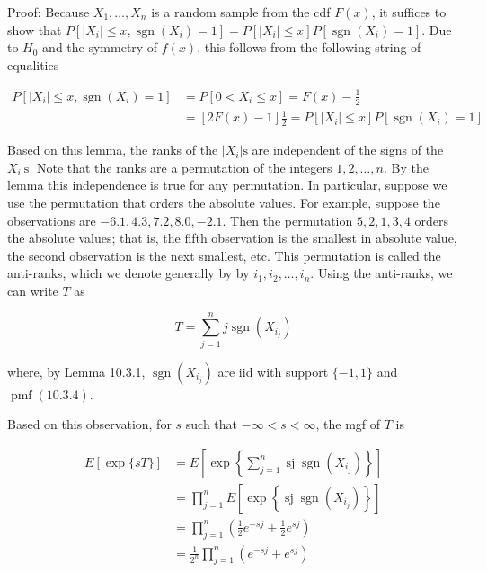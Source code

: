 Proof: Because $X_{1}, \ldots, X_{n}$ is a random sample from the cdf $F(x)$, it suffices to show that $P\left[\left|X_{i}\right| \leq x, \operatorname{sgn}\left(X_{i}\right)=1\right]=P\left[\left|X_{i}\right| \leq x\right] P\left[\operatorname{sgn}\left(X_{i}\right)=1\right]$. Due to $H_{0}$ and the symmetry of $f(x)$, this follows from the following string of equalities

$$
\begin{aligned}
P\left[\left|X_{i}\right| \leq x, \operatorname{sgn}\left(X_{i}\right)=1\right] & =P\left[0<X_{i} \leq x\right]=F(x)-\frac{1}{2} \\
& =[2 F(x)-1] \frac{1}{2}=P\left[\left|X_{i}\right| \leq x\right] P\left[\operatorname{sgn}\left(X_{i}\right)=1\right]
\end{aligned}
$$

Based on this lemma, the ranks of the $\left|X_{i}\right| \mathrm{s}$ are independent of the signs of the $X_{i} \mathrm{~s}$. Note that the ranks are a permutation of the integers $1,2, \ldots, n$. By the lemma this independence is true for any permutation. In particular, suppose we use the permutation that orders the absolute values. For example, suppose the observations are $-6.1,4.3,7.2,8.0,-2.1$. Then the permutation $5,2,1,3,4$ orders the absolute values; that is, the fifth observation is the smallest in absolute value, the second observation is the next smallest, etc. This permutation is called the anti-ranks, which we denote generally by by $i_{1}, i_{2}, \ldots, i_{n}$. Using the anti-ranks, we can write $T$ as


\begin{equation*}
T=\sum_{j=1}^{n} j \operatorname{sgn}\left(X_{i_{j}}\right) \tag{10.3.5}
\end{equation*}


where, by Lemma 10.3.1, $\operatorname{sgn}\left(X_{i_{j}}\right)$ are iid with support $\{-1,1\}$ and $\operatorname{pmf}(10.3 .4)$.

Based on this observation, for $s$ such that $-\infty<s<\infty$, the mgf of $T$ is


\begin{align*}
E[\exp \{s T\}] & =E\left[\exp \left\{\sum_{j=1}^{n} \operatorname{sj} \operatorname{sgn}\left(X_{i_{j}}\right)\right\}\right] \\
& =\prod_{j=1}^{n} E\left[\exp \left\{\operatorname{sj} \operatorname{sgn}\left(X_{i_{j}}\right)\right\}\right] \\
& =\prod_{j=1}^{n}\left(\frac{1}{2} e^{-s j}+\frac{1}{2} e^{s j}\right) \\
& =\frac{1}{2^{n}} \prod_{j=1}^{n}\left(e^{-s j}+e^{s j}\right) \tag{10.3.6}
\end{align*}


